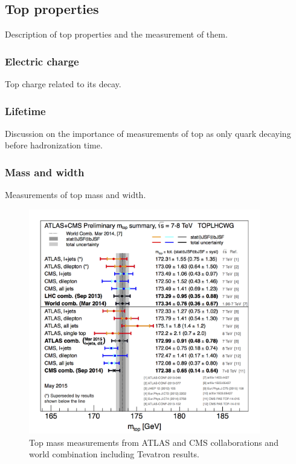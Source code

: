 
\subsection{Top properties}

Description of top properties and the measurement of them.

\subsubsection{Electric charge}

Top charge related to its decay.

\subsubsection{Lifetime}

Discussion on the importance of measurements of top as only quark decaying before hadronization time.

\subsubsection{Mass and width}

Measurements of top mass and width.

\begin{figure}[!Hhtbp]
  \begin{center}
    \includegraphics[width=0.9\textwidth]{figs/LHC_topmass_May2015.png}
    \caption{Top mass measurements from ATLAS and CMS collaborations and world combination including Tevatron results.}
    \label{fig:TopMass}
  \end{center}
\end{figure}

